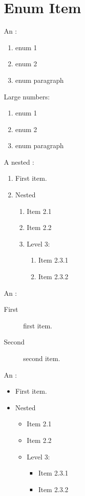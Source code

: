 \documentclass[lineno=off]{wunschnote}
\begin{document}
    \section{Enum Item}
    An :
    \begin{enumerate}
        \item enum 1
        \item enum 2
        \item enum paragraph \lipsum[2]
    \end{enumerate}
    Large numbers:
    \begin{enumerate}[start=9]
        \item enum 1
        \item enum 2
        \item enum paragraph \lipsum[2]
    \end{enumerate}

    A nested :
    \begin{enumerate}
        \item First item.
        \item Nested 
        \begin{enumerate}
            \item Item 2.1
            \item Item 2.2
            \item Level 3:
            \begin{enumerate}
                \item Item 2.3.1
                \item Item 2.3.2
            \end{enumerate}
        \end{enumerate}
    \end{enumerate}

    An :
    \begin{description}
        \item[First] first item.
        \item[Second] second item.
    \end{description}

    An :
    \begin{itemize}
        \item First item.
        \item Nested 
        \begin{itemize}
            \item Item 2.1
            \item Item 2.2
            \item Level 3:
            \begin{itemize}
                \item Item 2.3.1
                \item Item 2.3.2
            \end{itemize}
        \end{itemize}
    \end{itemize}
\end{document}
